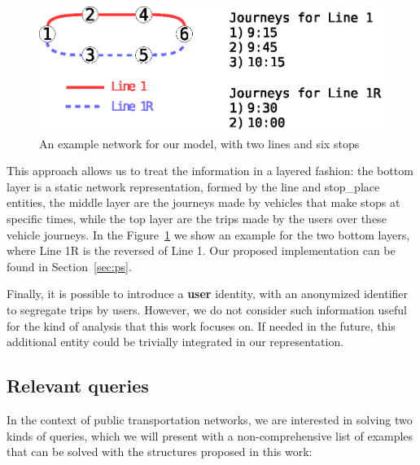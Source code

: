 \documentclass[runningheads]{llncs}
\begin{document}
\begin{figure}
\includegraphics[width=\textwidth]{example_network.eps}
\caption{An example network for our model, with two lines and six stops}
\label{fig:example_network}
\end{figure}

This approach allows us to treat the information in a layered fashion: the bottom layer is a static network representation, formed by the line and stop\_place entities, the middle layer are the journeys made by vehicles that make stops at specific times, while the top layer are the trips made by the users over these vehicle journeys. In the Figure~\ref{fig:example_network} we show an example for the two bottom layers, where Line 1R is the reversed of Line 1. Our proposed implementation can be found in Section~\ref{sec:ps}.

Finally, it is possible to introduce a \textbf{user} identity, with an anonymized identifier to segregate trips by users. However, we do not consider such information useful for the kind of analysis that this work focuses on. If needed in the future, this additional entity could be trivially integrated in our representation.

\subsection{Relevant queries}
\label{sec:rq}
In the context of public transportation networks, we are interested in solving two kinds of queries, which we will present with a non-comprehensive list of examples that can be solved with the structures proposed in this work:
\end{document}
